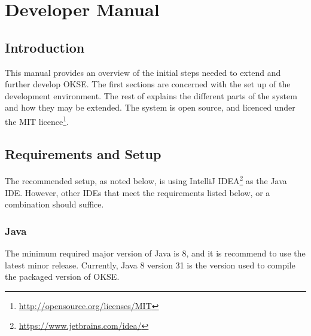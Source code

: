 
 
 
\lstset{style=mystyle}

\chapter{Developer Manual}
\label{appendix-developer-manual}

\section{Introduction}

This manual provides an overview of the initial steps needed to extend and further develop OKSE. The first sections are concerned with the set up of the development environment. The rest of explains the different parts of the system and how they may be extended. The system is open source, and licenced under the MIT licence\footnote{\url{http://opensource.org/licenses/MIT}}.

\section{Requirements and Setup}
The recommended setup, as noted below, is using IntelliJ IDEA\footnote{\url{https://www.jetbrains.com/idea/}} as the Java IDE. However, other IDEs that meet the requirements listed below, or a combination should suffice. 

\subsection{Java}
The minimum required major version of Java is 8, and it is recommend to use the latest minor release. Currently, Java 8 version 31 is the version used to compile the packaged version of OKSE.

